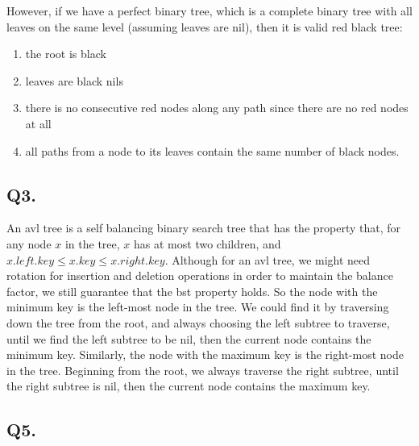 \documentclass[12pt]{article}
\begin{document}
\noindent However, if we have a perfect binary tree, which is a complete binary tree with all leaves on the same level (assuming leaves are nil), then it is valid red black tree:
     \begin{enumerate}
          \setlength \itemsep{0em} 
          \item the root is black
          \item leaves are black nils
          \item there is no consecutive red nodes along any path since there are no red nodes at all
          \item all paths from a node to its leaves contain the same number of black nodes.
     \end{enumerate}

\subsection*{Q3.}
An avl tree is a self balancing binary search tree that has the property that, for any node \(x\) in the tree, \(x\) has at most two children, and \(x.left.key \leq x.key \leq x.right.key\). Although for an avl tree, we might need rotation for insertion and deletion operations in order to maintain the balance factor, we still guarantee that the bst property holds. So the node with the minimum key is the left-most node in the tree. We could find it by traversing down the tree from the root, and always choosing the left subtree to traverse, until we find the left subtree to be nil, then the current node contains the minimum key. Similarly, the node with the maximum key is the right-most node in the tree. Beginning from the root, we always traverse the right subtree, until the right subtree is nil, then the current node contains the maximum key. 

\subsection*{Q5.}
\end{document}
